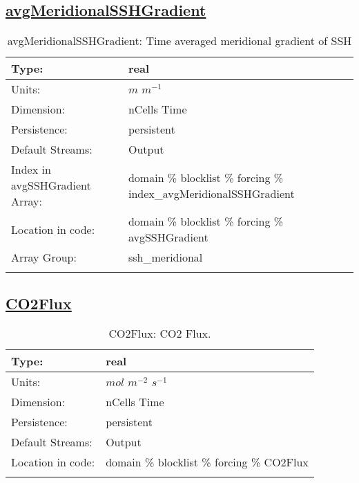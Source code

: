 \subsection[avgMeridionalSSHGradient]{\hyperref[sec:var_tab_forcing]{avgMeridionalSSHGradient}}
\label{subsec:var_sec_forcing_avgMeridionalSSHGradient}
\begin{center}
\begin{longtable}{| p{2.0in} | p{4.0in} |}
        \hline 
        Type: & real \\
        \hline 
        Units: & $m$ $m^{-1}$ \\
        \hline 
        Dimension: & nCells Time \\
        \hline 
        Persistence: & persistent \\
        \hline 
		 Default Streams: & Output  \\
        \hline 
		 Index in avgSSHGradient Array: & domain \% blocklist \% forcing \% index\_avgMeridionalSSHGradient \\
		 \hline 
		 Location in code: & domain \% blocklist \% forcing \% avgSSHGradient \\
		 \hline 
		 Array Group: & ssh\_meridional \\
		 \hline 
    \caption{avgMeridionalSSHGradient: Time averaged meridional gradient of SSH}
\end{longtable}
\end{center}
\subsection[CO2Flux]{\hyperref[sec:var_tab_forcing]{CO2Flux}}
\label{subsec:var_sec_forcing_CO2Flux}
\begin{center}
\begin{longtable}{| p{2.0in} | p{4.0in} |}
        \hline 
        Type: & real \\
        \hline 
        Units: & $mol$ $m^{-2}$ $s^{-1}$ \\
        \hline 
        Dimension: & nCells Time \\
        \hline 
        Persistence: & persistent \\
        \hline 
		 Default Streams: & Output  \\
        \hline 
		 Location in code: & domain \% blocklist \% forcing \% CO2Flux \\
		 \hline 
    \caption{CO2Flux: CO2 Flux.}
\end{longtable}
\end{center}
